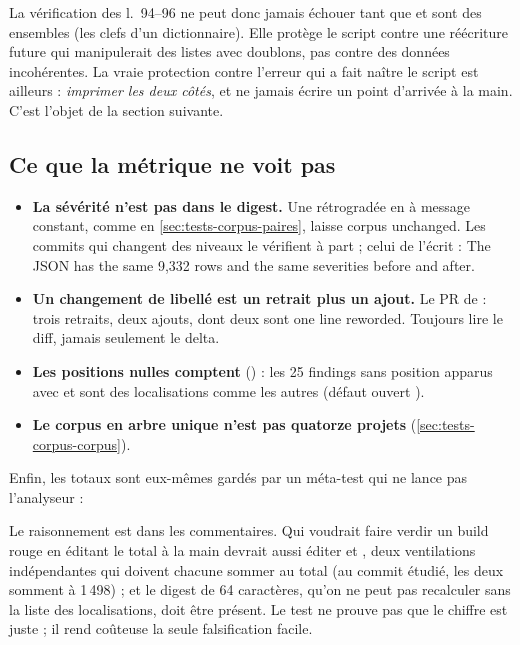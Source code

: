 La vérification des l.~94--96 ne peut donc jamais échouer tant que  et  sont des ensembles (les clefs d'un dictionnaire). Elle protège le script contre une réécriture future qui manipulerait des listes avec doublons, pas contre des données incohérentes. La vraie protection contre l'erreur qui a fait naître le script est ailleurs : \emph{imprimer les deux côtés}, et ne jamais écrire un point d'arrivée à la main. C'est l'objet de la section suivante.

\subsection{Ce que la métrique ne voit pas}

\begin{piege}
\begin{itemize}
  \item \textbf{La sévérité n'est pas dans le digest.} Une \Error{} rétrogradée en \Warning{} à message constant, comme  en \cref{sec:tests-corpus-paires}, laisse \og corpus unchanged\fg{}. Les commits qui changent des niveaux le vérifient à part ; celui de  l'écrit : \og The JSON has the same 9,332 rows and the same severities before and after\fg{}.
  \item \textbf{Un changement de libellé est un retrait plus un ajout.} Le PR de  : trois retraits, deux ajouts, dont deux sont \og one line reworded\fg{}. Toujours lire le diff, jamais seulement le delta.
  \item \textbf{Les positions nulles comptent} () : les 25 findings sans position apparus avec  et  sont des localisations comme les autres (défaut ouvert ).
  \item \textbf{Le corpus en arbre unique n'est pas quatorze projets} (\cref{sec:tests-corpus-corpus}).
\end{itemize}
\end{piege}

Enfin, les totaux sont eux-mêmes gardés par un méta-test qui ne lance pas l'analyseur :


Le raisonnement est dans les commentaires. Qui voudrait faire verdir un build rouge en éditant le total à la main devrait aussi éditer  et , deux ventilations indépendantes qui doivent chacune sommer au total (au commit étudié, les deux somment à 1\,498) ; et le digest de 64 caractères, qu'on ne peut pas recalculer sans la liste des localisations, doit être présent. Le test ne prouve pas que le chiffre est juste ; il rend coûteuse la seule falsification facile.

